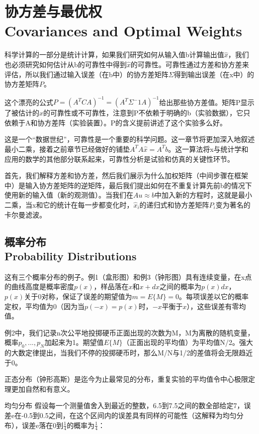 \section[协方差与最优权]{协方差与最优权\\Covariances and Optimal Weights}
科学计算的一部分是统计计算，如果我们研究如何从输入值b计算输出值$\hat{x}$，我们也必须研究如何估计从b的可靠性中得到$\hat{x}$的可靠性。可靠性通过方差和协方差来评估，所以我们通过输入误差（在b中）的协方差矩阵$\Sigma$得到输出误差（在x中）的协方差矩阵$P$。

这个漂亮的公式$P=(A^TCA)^{-1}=(A^T\Sigma^-1A)^{-1}$给出那些协方差值。矩阵P显示了被估计的$\hat{x}$的可靠性或不可靠性，注意到P不依赖于明确的b（实验数据），它只依赖于A和协方差阵（实验装置）。P的含义提前讲述了这个实验多么好。

这是一个“数据世纪”，可靠性是一个重要的科学问题。这一章节将更加深入地叙述最小二乘，接着之前章节已经做好的铺垫$A^TA\hat{x}=A^Tb$。这一算法将x与统计学和应用的数学的其他部分联系起来，可靠性分析是试验和仿真的关键性环节。

首先，我们解释方差和协方差，然后我们展示为什么加权矩阵（中间步骤在框架中）是输入协方差矩阵的逆矩阵，最后我们提出如何在不重复计算先前b的情况下使用新的输入值（新的观测值）。当我们在$Au\approx b$中加入新的方程时，这就是最小二乘，当x和它的统计在每一步都变化时，$\hat{x}_i$的递归式和协方差矩阵$P_i$变为著名的卡尔曼滤波。
	
	\subsection[概率分布]{概率分布\\Probability Distributions}
	这有三个概率分布的例子。例1（盒形图）和例3（钟形图）具有连续变量，在x点的曲线高度是概率密度$p(x)$，样品落在$x$和$x+dx$之间的概率为$p(x)dx$，$p(x)$关于0对称，保证了误差的期望值为$m=E\{M\}=0$。每项误差以它的概率定权，平均值为0（因为当$p(-x)=p(x)$时，$-x$平衡于$x$），这些误差有零均值。
	
	例2中，我们记录n次公平地投掷硬币正面出现的次数为M，M为离散的随机变量，概率$p_0,...,p_N$加起来为1。期望值$E\{M\}$（正面出现的平均值）为平均值N/2。强大的大数定律提出，当我们不停的投掷硬币时，那么M/N与1/2的差值将会无限趋近于0。
	
	正态分布（钟形高斯）是迄今为止最常见的分布，重复实验的平均值令中心极限定理更加自然和有意义。
	
	均匀分布   \quad 假设每一个测量值舍入到最近的整数，6.5到7.5之间的数全部给定7，误差e在-0.5到0.5之间，在这个区间内的误差具有同样的可能性（这解释为均匀分布），误差e落在0到$\frac{1}{4}$的概率为$\frac{1}{4}$：
	
